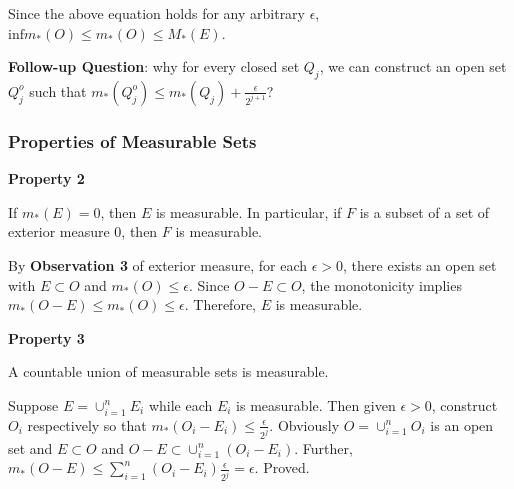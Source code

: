 \documentclass[
]{article}
\begin{document}
Since the above equation holds for any arbitrary \(\epsilon\),
\(\mathrm{inf}m_*(O)\leq m_*(O)\leq M_*(E)\).

\textbf{Follow-up Question}: why for every closed set \(Q_j\), we can
construct an open set \(Q_{j}^{o}\) such that
\(m_*(Q_j^o)\leq m_*(Q_j)+\frac{\epsilon}{2^{j+1}} \)?

\hypertarget{header-n25}{%
\subsubsection{Properties of Measurable Sets}\label{header-n25}}

\textbf{Property 2}

If \(m_*(E)=0\), then \(E\) is measurable. In particular, if \(F\) is a
subset of a set of exterior measure 0, then \(F\) is measurable.

By \textbf{Observation 3} of exterior measure, for each
\(\epsilon > 0\), there exists an open set with \(E \subset O\) and
\(m_*(O)\leq \epsilon\). Since \(O-E \subset O\), the monotonicity
implies \(m_*(O-E)\leq m_*(O)\leq \epsilon\). Therefore, \(E\) is
measurable.

\textbf{Property 3}

A countable union of measurable sets is measurable.

Suppose \(E=\cup_{i=1}^nE_i\) while each \(E_i\) is measurable. Then
given \(\epsilon>0\), construct \(O_i\) respectively so that
\(m_*(O_i-E_i)\leq \frac{\epsilon}{2^j}\). Obviously
\(O=\cup_{i=1}^nO_i\) is an open set and \(E\subset O\) and
\(O-E\subset \cup_{i=1}^n(O_i-E_i)\). Further,
\(m_*(O-E)\leq \sum_{i=1}^n(O_i-E_i)\frac{\epsilon}{2^j}=\epsilon\).
Proved.
\end{document}
